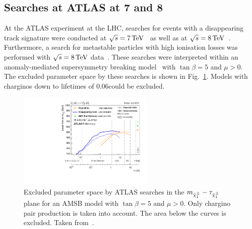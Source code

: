\subsection*{Searches at ATLAS at 7 and 8\tev}
At the ATLAS experiment at the LHC, searches for events with a disappearing track signature were conducted at $\sqrt{s}=7\,\text{Te}\kern-0.06667em\text{V}$~\cite{bib:PreviousSearches_Atlas_DT_7TeV} as well as at $\sqrt{s}=8\,\text{Te}\kern-0.06667em\text{V}$~\cite{bib:PreviousSearches_Atlas_DT_8TeV}. 
Furthermore, a search for metastable particles with high ionisation losses was performed with $\sqrt{s}=8\,\text{Te}\kern-0.06667em\text{V}$ data~\cite{bib:PreviousSearches_ATLAS_DEDX}.
These searches were interpreted within an anomaly-mediated supersymmetry breaking model~\cite{bib:Theory_AMSB_1998} with $\tan\beta=5$ and $\mu>0$.
The excluded parameter space by these searches is shown in Fig.~\ref{fig:ATLAS}.
Models with charginos down to lifetimes of 0.06\ns could be excluded.
\begin{figure}[!h]
  \centering
      \includegraphics[width=0.59\textwidth]{figures/theory/ATLAS_SUSY_LLPChargino.pdf}
  \caption{Excluded parameter space by ATLAS searches in the $m_{\tilde{\chi}^{\pm}_{1}}-\tau_{\tilde{\chi}^{\pm}_{1}}$ plane for an AMSB model with $\tan\beta=5$ and $\mu>0$. Only chargino pair production is taken into account. The area below the curves is excluded. Taken from~\cite{bib:ATLAS_SUMMARYPLOTS}.}  
  \label{fig:ATLAS}
\end{figure}

